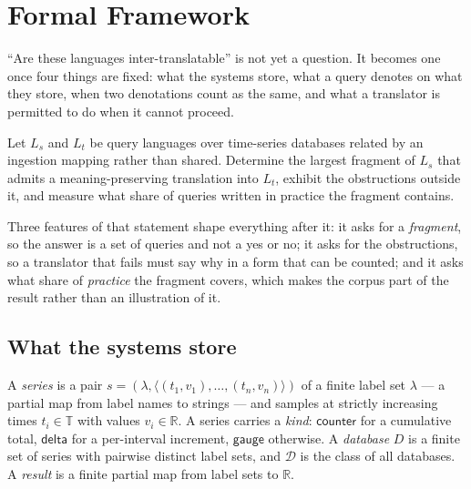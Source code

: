 
\section{Formal Framework}
\label{s2:sec:framework}

``Are these languages inter-translatable'' is not yet a question. It becomes one once
four things are fixed: what the systems store, what a query denotes on what they store,
when two denotations count as the same, and what a translator is permitted to do when it
cannot proceed.

\begin{problem}
Let $L_s$ and $L_t$ be query languages over time-series databases related by an
ingestion mapping rather than shared. Determine the largest fragment of $L_s$ that admits
a meaning-preserving translation into $L_t$, exhibit the obstructions outside it, and
measure what share of queries written in practice the fragment contains.
\end{problem}

\noindent
Three features of that statement shape everything after it: it asks for a \emph{fragment},
so the answer is a set of queries and not a yes or no; it asks for the obstructions, so a
translator that fails must say why in a form that can be counted; and it asks what share of
\emph{practice} the fragment covers, which makes the corpus part of the result rather than
an illustration of it.

\subsection{What the systems store}

\begin{definition}\label{s2:def:model}
A \emph{series} is a pair $s=(\lambda,\langle (t_1,v_1),\dots,(t_n,v_n)\rangle)$ of a
finite label set $\lambda$ --- a partial map from label names to strings --- and samples
at strictly increasing times $t_i\in\mathbb{T}$ with values $v_i\in\mathbb{R}$. A series
carries a \emph{kind}: $\mathsf{counter}$ for a cumulative total, $\mathsf{delta}$ for a
per-interval increment, $\mathsf{gauge}$ otherwise. A \emph{database} $D$ is a finite set
of series with pairwise distinct label sets, and $\mathcal{D}$ is the class of all
databases. A \emph{result} is a finite partial map from label sets to $\mathbb{R}$.
\end{definition}


